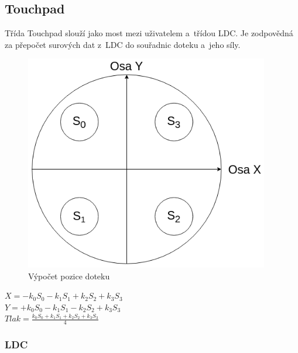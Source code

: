 \subsection{Touchpad}

Třída Touchpad slouží jako most mezi uživatelem a~třídou LDC.
Je zodpovědná za přepočet surových dat z~LDC do souřadnic doteku a~jeho síly.

\begin{figure}[H]
    \begin{small}
        \begin{center}
            \includegraphics[width=0.95\textwidth]{img/Touchpad_calculation.png}
        \end{center}
        \caption{Výpočet pozice doteku}
        \label{fig:touchpad_calculation}
    \end{small}
\end{figure}

\begin{listedequation}[H]
    \begin{center}
        $X = -k_0S_0 -k_1S_1 +k_2S_2 +k_3S_3$\\
        $Y = +k_0S_0 -k_1S_1 -k_2S_2 +k_3S_3$\\
        $Tlak = \frac{k_0S_0 +k_1S_1 +k_2S_2 +k_3S_3}{4}$
    \end{center}
    \caption{Výpočet parametrů doteku}
    \label{eq:touchpad_calculation_X}
\end{listedequation}

\subsubsection{LDC}

